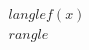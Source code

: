 \documentclass[preview]{standalone}
\begin{document}
\begin{align*}
\quad\\langle f(x) \quad\\rangle
\end{align*}
\end{document}
